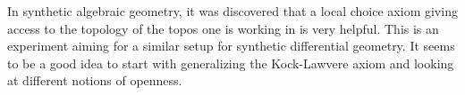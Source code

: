 
In synthetic algebraic geometry, it was discovered that a local choice axiom giving access to the topology of the topos one is working in is very helpful.
This is an experiment aiming for a similar setup for synthetic differential geometry.
It seems to be a good idea to start with generalizing the Kock-Lawvere axiom and looking at different notions of openness.

